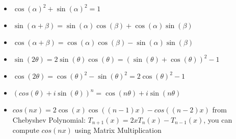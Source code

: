 {\normalsize
    \begin{itemize}
        \item $\cos(\alpha)^2 + \sin(\alpha)^2 = 1$
        \item $\sin(\alpha + \beta) = \sin(\alpha)\cos(\beta) + \cos(\alpha)\sin(\beta)$
        \item $\cos(\alpha + \beta) = \cos(\alpha)\cos(\beta) - \sin(\alpha)\sin(\beta)$
        \item $\sin(2\theta) = 2\sin(\theta)\cos(\theta) = (\sin(\theta) + \cos(\theta))^2 - 1$
        \item $\cos(2\theta) = \cos(\theta)^2 - \sin(\theta)^2 = 2\cos(\theta)^2 - 1$
        \item $(cos(\theta) + i\sin(\theta))^n = \cos(n \theta) + i\sin(n \theta)$
        \item $cos(nx) = 2\cos(x)\cos((n-1)x) - cos((n-2)x)$ from Chebyshev Polynomial: $T_{n+1}(x) = 2xT_{n}(x) - T_{n-1}(x)$, you can compute $cos(nx)$ using Matrix Multiplication
    \end{itemize} 
}
